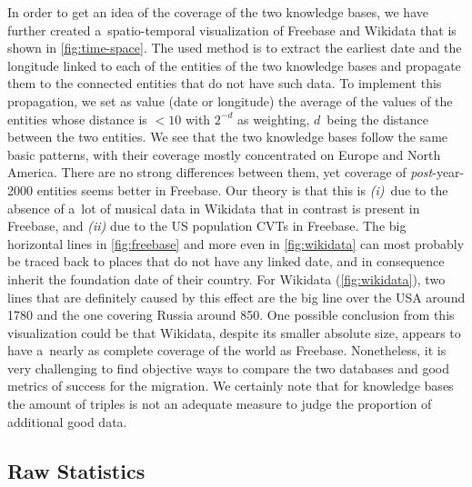 \documentclass{acm_proc_article-sp}
\begin{document}
In order to get an idea of the coverage of the two knowledge bases,
we have further created a~spatio-temporal visualization of Freebase and Wikidata 
that is shown in \autoref{fig:time-space}.
The used method is to extract the earliest date and the longitude
linked to each of the entities of the two knowledge bases
and propagate them to the connected entities that do not have such data.
To implement this propagation, we set as value (date or longitude)
the average of the values of the entities whose distance is $<10$
with $2^{-d}$ as weighting, $d$~being the distance between the two entities.
We see that the two knowledge bases follow the same basic patterns,
with their coverage mostly concentrated on Europe and North America.
There are no strong differences between them,
yet coverage of \mbox{\emph{post}-year-2000} entities seems better in Freebase.
Our theory is that this is \emph{(i)}~due to the absence of a~lot of musical data in Wikidata
that in contrast is present in Freebase,
and \emph{(ii)} due to the US population CVTs in Freebase.
The big horizontal lines in \autoref{fig:freebase} and more even in \autoref{fig:wikidata}
can most probably be traced back to places that do not have any linked date,
and in consequence inherit the foundation date of their country.
For Wikidata (\autoref{fig:wikidata}), two lines that are definitely caused by this effect
are the big line over the USA around 1780
and the one covering Russia around 850.
One possible conclusion from this visualization could be that Wikidata,
despite its smaller absolute size, appears to have
a~nearly as complete coverage of the world as Freebase.
Nonetheless, it is very challenging to find objective ways to compare the two databases
and good metrics of success for the migration.
We certainly note that for knowledge bases the amount of triples is not an adequate measure
to judge the proportion of additional good data.

\subsection{Raw Statistics}
\end{document}

